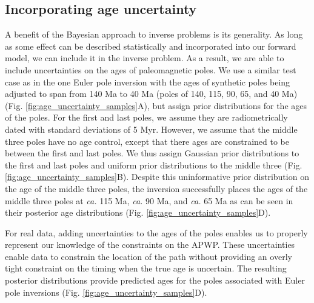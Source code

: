 \documentclass[11pt,letterpaper]{article}
\begin{document}
\subsection*{Incorporating age uncertainty}
\label{sec:age_uncertainty}
A benefit of the Bayesian approach to inverse problems is its generality. As long as some effect can be described statistically and incorporated into our forward model, we can include it in the inverse problem. As a result, we are able to include uncertainties on the ages of paleomagnetic poles. We use a similar test case as in the one Euler pole inversion with the ages of synthetic poles being adjusted to span from 140 Ma to 40 Ma (poles of 140, 115, 90, 65, and 40 Ma) (Fig. \ref{fig:age_uncertainty_samples}A), but assign prior distributions for the ages of the poles. For the first and last poles, we assume they are radiometrically dated with standard deviations of 5 Myr. However, we assume that the middle three poles have no age control, except that there ages are constrained to be between the first and last poles. We thus assign Gaussian prior distributions to the first and last poles and uniform prior distributions to the middle three (Fig. \ref{fig:age_uncertainty_samples}B). Despite this uninformative prior distribution on the age of the middle three poles, the inversion successfully places the ages of the middle three poles at \textit{ca.} 115 Ma, \textit{ca.} 90 Ma,  and \textit{ca.} 65 Ma as can be seen in their posterior age distributions (Fig. \ref{fig:age_uncertainty_samples}D).

For real data, adding uncertainties to the ages of the poles enables us to properly represent our knowledge of the constraints on the APWP. These uncertainties enable data to constrain the location of the path without providing an overly tight constraint on the timing when the true age is uncertain. The resulting posterior distributions provide predicted ages for the poles associated with Euler pole inversions (Fig. \ref{fig:age_uncertainty_samples}D).
\end{document}
